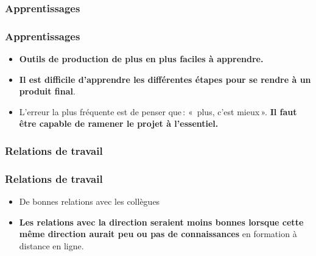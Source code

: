 					\subsubsection{Apprentissages} 
						\begin{frame}[allowframebreaks]
						\frametitle{Apprentissages}
                        			 
                        			\begin{itemize}
                        			\item \textbf{Outils de production de plus en plus faciles à apprendre. }
                        			\item \textbf{Il est difficile d'apprendre les différentes étapes pour se rendre à un produit final}.
                        			\item L’erreur la plus fréquente est de penser que\,: «\, plus, c’est mieux\,». \textbf{Il faut être capable de ramener le projet à l’essentiel.}

                        				
						\end{itemize}
						\end{frame}	
						
					\subsubsection{Relations de travail} 
						\begin{frame}[allowframebreaks]
						\frametitle{Relations de travail}
                        			\begin{itemize}
                        			\item De bonnes relations avec les collègues
                        			\item \textbf{Les relations avec la direction seraient moins bonnes lorsque cette même direction aurait peu ou pas de connaissances} en formation à distance en ligne.

                        				
						\end{itemize}
						\end{frame}	
						
